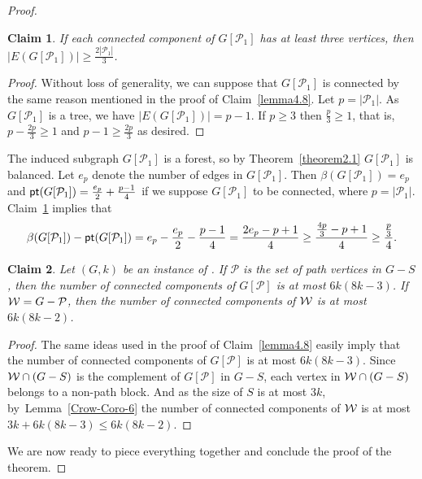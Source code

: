 \documentclass[
final
]{dmtcs-episciences}
\newtheorem{claimN}{Claim}{\bfseries}{\itshape}
\begin{document}
\begin{proof}
	\begin{claimN}\label{claim:2-3}
If each connected component of $G[\mathcal{P}_1]$ has at least three vertices, then $|E(G[\mathcal{P}_1])|\geq \frac{2|\mathcal{P}_1|}{3}$.
	\end{claimN}
	\begin{proof} Without loss of generality, we can suppose that $G[\mathcal{P}_1]$ is connected by the same reason mentioned in the proof of Claim~\ref{lemma4.8}. Let $p=|\mathcal{P}_1|$. As $G[\mathcal{P}_1]$ is a tree, we have $|E(G[\mathcal{P}_1])|= p-1$. If $p\geq 3$ then $\frac{p}{3}\geq 1$, that is, $p-\frac{2p}{3}\geq 1$ and $p-1\geq\frac{2p}{3}$ as desired. \end{proof}

The induced subgraph $G[\mathcal{P}_1]$ is a forest, so by Theorem~\ref{theorem2.1} $G[\mathcal{P}_1]$ is balanced. Let $e_p$ denote the number of edges in $G[\mathcal{P}_1]$. Then $\beta(G[\mathcal{P}_1])=e_p$  and ${\sf pt}(G[\mathcal{P}_1])=\frac{e_p}{2}+\frac{p-1}{4}$ if we suppose $G[\mathcal{P}_1]$ to be connected, where $p = |\mathcal{P}_1|$. Claim~\ref{claim:2-3} implies that
\begin{equation}\label{eq:P1}
\beta(G[\mathcal{P}_1])-{\sf pt}(G[\mathcal{P}_1])=e_p-\frac{e_p}{2}-\frac{p-1}{4}=
\frac{2e_p-p+1}{4}\geq \frac{\frac{4p}{3}-p+1}{4} \geq \frac{\frac{p}{3}}{4}.
\end{equation}

\begin{claimN}\label{claim:number-comp}
Let $(G,k)$ be an instance of {}. If $\mathcal{P}$ is the set of path vertices in $G-S$, then the number of connected components of $G[\mathcal{P}]$ is at most $6k(8k-3)$. If ${\cal W}=G-\mathcal{P}$, then the number of connected components of ${\cal W}$ is  at most $6k(8k-2)$.
	\end{claimN}
\begin{proof}
 The same ideas used in the proof of Claim~\ref{lemma4.8} easily imply that the number of connected components of $G[\mathcal{P}]$ is at most $6k(8k-3)$. Since ${\cal W}\cap(G-S)$ is the complement of $G[\mathcal{P}]$ in $G-S$, each vertex in ${\cal W} \cap(G-S)$ belongs to a non-path block. And as the size of $S$ is at most $3k$, by~Lemma~\ref{Crow-Coro-6} the number of connected components of ${\cal W}$ is  at most $3k + 6k(8k-3) \leq  6k(8k-2)$. \end{proof}

We are now ready to piece everything together and conclude the proof of the theorem.


\end{proof}
\end{document}
